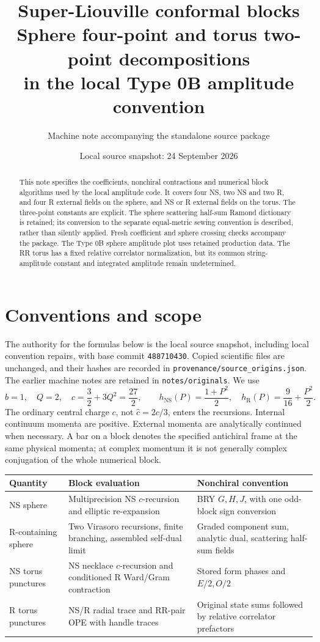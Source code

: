 \documentclass[11pt]{article}
\title{\textbf{Super-Liouville conformal blocks}\\
  \large Sphere four-point and torus two-point decompositions\\
  in the local Type 0B amplitude convention}
\author{Machine note accompanying the standalone source package}
\date{Local source snapshot: 24 September 2026}
\newcommand{\NS}{\mathrm{NS}}
\newcommand{\R}{\mathrm{R}}
\newcommand{\code}[1]{\texttt{\small #1}}
\begin{document}
\maketitle
\begin{abstract}
This note specifies the coefficients, nonchiral contractions and numerical
block algorithms used by the local amplitude code. It covers four NS,
two NS and two R, and four R external fields on the sphere, and NS or R
external fields on the torus. The three-point constants are explicit.
The sphere scattering half-sum Ramond dictionary is retained; its
conversion to the separate equal-metric sewing convention is described,
rather than silently applied. Fresh coefficient and sphere crossing
checks accompany the package. The Type 0B sphere amplitude plot uses
retained production data. The RR torus has a fixed relative correlator
normalization, but its common string-amplitude constant and integrated
amplitude remain undetermined.
\end{abstract}
\tableofcontents

\section{Conventions and scope}
The authority for the formulas below is the local source snapshot,
including local convention repairs, with base commit
\code{488710430}. Copied scientific files are unchanged, and their hashes
are recorded in \code{provenance/source\_origins.json}.
The earlier machine notes are retained in \code{notes/originals}.
We use
\begin{equation}
 b=1,\quad Q=2,\quad c=\frac32+3Q^2=\frac{27}{2},\qquad
 h_\NS(P)=\frac{1+P^2}{2},\quad h_\R(P)=\frac9{16}+\frac{P^2}{2}.
 \label{eq:weights}
\end{equation}
The ordinary central charge \(c\), not \(\hat c=2c/3\), enters the
recursions. Internal continuum momenta are positive. External momenta
are analytically continued when necessary. A bar on a block denotes
the specified antichiral frame at the same physical momenta; at
complex momentum it is not generally complex conjugation of the
whole numerical block.

\begin{center}
\begin{tabular}{p{.21\linewidth}p{.35\linewidth}p{.33\linewidth}}
\toprule
Quantity & Block evaluation & Nonchiral convention\\ \midrule
NS sphere & Multiprecision NS \(c\)-recursion and elliptic re-expansion &
BRY \(G,H,J\), with one odd-block sign conversion\\
R-containing sphere & Two Virasoro recursions, finite branching,
assembled self-dual limit & Graded component sum, analytic dual,
scattering half-sum fields\\
NS torus punctures & NS necklace \(c\)-recursion and conditioned R
Ward/Gram contraction & Stored form phases and \(E/2,O/2\)\\
R torus punctures & NS/R radial trace and RR-pair OPE with handle traces &
Original state sums followed by relative correlator prefactors\\
\bottomrule
\end{tabular}
\end{center}
\end{document}
